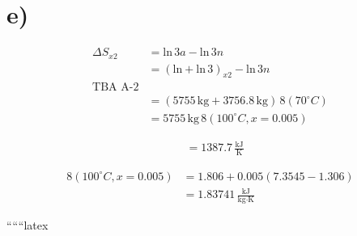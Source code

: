 

\section*{e)}
\begin{align*}
    \Delta S_{x2} &= \text{ln} \, 3a - \text{ln} \, 3n \\
    &= (\text{ln} + \text{ln} \, 3)_{x2} - \text{ln} \, 3n \\
    \text{TBA A-2} \\
    &= (5755 \, \text{kg} + 3756.8 \, \text{kg}) \, 8(70^\circ C) \\
    &= 5755 \, \text{kg} \, 8(100^\circ C, x=0.005)
\end{align*}

\begin{align*}
    &= 1387.7 \, \frac{\text{kJ}}{\text{K}}
\end{align*}

\begin{align*}
    8(100^\circ C, x=0.005) &= 1.806 + 0.005 (7.3545 - 1.306) \\
    &= 1.83741 \, \frac{\text{kJ}}{\text{kg} \cdot \text{K}}
\end{align*}

``````latex